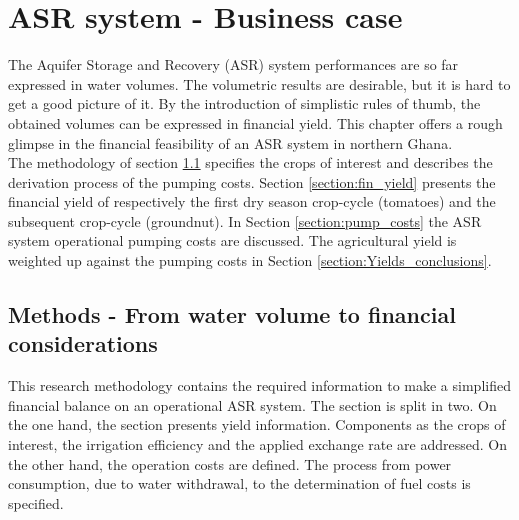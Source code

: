 \chapter{ASR system - Business case}
\label{chapter:yield}
The Aquifer Storage and Recovery (ASR) system performances are so far expressed in water volumes. The volumetric results are desirable, but it is hard to get a good picture of it. By the introduction of simplistic rules of thumb, the obtained volumes can be expressed in financial yield. This chapter offers a rough glimpse in the financial feasibility of an ASR system in northern Ghana. \\
The methodology of section \ref{section:Theory_yields} specifies the crops of interest and describes the derivation process of the pumping costs. Section \ref{section:fin_yield} presents the financial yield of respectively the first dry season crop-cycle (tomatoes) and the subsequent crop-cycle (groundnut). In Section \ref{section:pump_costs} the ASR system operational pumping costs are discussed. The agricultural yield is weighted up against the pumping costs in Section \ref{section:Yields_conclusions}. 


\section{Methods - From water volume to financial considerations}
\label{section:Theory_yields}
This research methodology contains the required information to make a simplified financial balance on an operational ASR system. The section is split in two. On the one hand, the section presents yield  information. Components as the crops of interest, the irrigation efficiency and the applied exchange rate are addressed. On the other hand, the operation costs are defined. The process from power consumption, due to water withdrawal, to the determination of fuel costs is specified.

